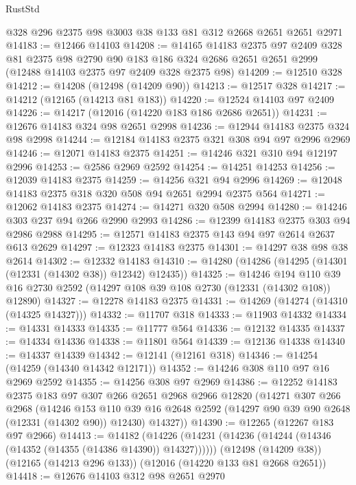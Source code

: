 \begin{lexlean}{RustStd}
\begin{coremodule}
    @328
    @296
    @2375
    @98
    @3003
    @38
    @133
    @81
    @312
    @2668
    @2651
    @2651
    @2971
@14183 := @12466 @14103
@14208 := @14165
    @14183
    @2375
    @97
    @2409
    @328
    @81
    @2375
    @98
    @2790
    @90
    @183
    @186
    @324
    @2686
    @2651
    @2651
    @2999
    (@12488 @14103 @2375 @97 @2409 @328 @2375 @98)
@14209 := @12510 @328
@14212 := @14208 (@12498 (@14209 @90))
@14213 := @12517 @328
@14217 := @14212 (@12165 (@14213 @81 @183))
@14220 := @12524 @14103 @97 @2409
@14226 := @14217 (@12016 (@14220 @183 @186 @2686 @2651))
@14231 := @12676 @14183 @324 @98 @2651 @2998
@14236 := @12944 @14183 @2375 @324 @98 @2998
@14244 := @12184 @14183 @2375 @321 @308 @94 @97 @2996 @2969
@14246 := @12071 @14183 @2375
@14251 := @14246 @321 @310 @94 @12197 @2996
@14253 := @2586 @2969 @2592
@14254 := @14251 @14253
@14256 := @12039 @14183 @2375
@14259 := @14256 @321 @94 @2996
@14269 := @12048 @14183 @2375 @318 @320 @508 @94 @2651 @2994 @2375 @564
@14271 := @12062 @14183 @2375
@14274 := @14271 @320 @508 @2994
@14280 := @14246 @303 @237 @94 @266 @2990 @2993
@14286 := @12399 @14183 @2375 @303 @94 @2986 @2988
@14295 := @12571 @14183 @2375 @143 @94 @97 @2614 @2637 @613 @2629
@14297 := @12323 @14183 @2375
@14301 := @14297 @38 @98 @38 @2614
@14302 := @12332 @14183
@14310 := @14280 (@14286 (@14295 (@14301 (@12331 (@14302 @38)) @12342) @12435))
@14325 := @14246
    @194
    @110
    @39
    @16
    @2730
    @2592
    (@14297 @108 @39 @108 @2730 (@12331 (@14302 @108)) @12890)
@14327 := @12278 @14183 @2375
@14331 := @14269 (@14274 (@14310 (@14325 @14327)))
@14332 := @11707 @318
@14333 := @11903 @14332
@14334 := @14331 @14333
@14335 := @11777 @564
@14336 := @12132 @14335
@14337 := @14334 @14336
@14338 := @11801 @564
@14339 := @12136 @14338
@14340 := @14337 @14339
@14342 := @12141 (@12161 @318)
@14346 := @14254 (@14259 (@14340 @14342 @12171))
@14352 := @14246 @308 @110 @97 @16 @2969 @2592
@14355 := @14256 @308 @97 @2969
@14386 := @12252
    @14183
    @2375
    @183
    @97
    @307
    @266
    @2651
    @2968
    @2966
    @12820
    (@14271
      @307
      @266
      @2968
      (@14246
        @153
        @110
        @39
        @16
        @2648
        @2592
        (@14297 @90 @39 @90 @2648 (@12331 (@14302 @90)) @12430)
        @14327))
@14390 := @12265 (@12267 @183 @97 @2966)
@14413 := @14182
    (@14226 (@14231 (@14236 (@14244 (@14346 (@14352 (@14355 (@14386 @14390)) @14327))))))
    (@12498 (@14209 @38))
    (@12165 (@14213 @296 @133))
    (@12016 (@14220 @133 @81 @2668 @2651))
@14418 := @12676 @14103 @312 @98 @2651 @2970

\end{coremodule}
\end{lexlean}
